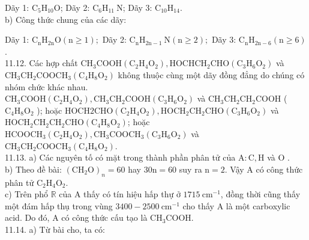 \documentclass[10pt]{article}
\begin{document}
Dãy 1: $\mathrm{C}_{5} \mathrm{H}_{10} \mathrm{O}$; Dãy 2: $\mathrm{C}_{6} \mathrm{H}_{11} \mathrm{~N}$; Dãy 3: $\mathrm{C}_{10} \mathrm{H}_{14}$.\\
b) Công thức chung của các dãy:

Dãy 1: $\mathrm{C}_{\mathrm{n}} \mathrm{H}_{2 \mathrm{n}} \mathrm{O}(\mathrm{n} \geq 1) ;$ Dãy 2: $\mathrm{C}_{\mathrm{n}} \mathrm{H}_{2 \mathrm{n}-1} \mathrm{~N}(\mathrm{n} \geq 2) ;$ Dãy 3: $\mathrm{C}_{\mathrm{n}} \mathrm{H}_{2 \mathrm{n}-6}(\mathrm{n} \geq 6)$.\\
11.12. Các hợp chất $\mathrm{CH}_{3} \mathrm{COOH}\left(\mathrm{C}_{2} \mathrm{H}_{4} \mathrm{O}_{2}\right), \mathrm{HOCH} \mathrm{CH}_{2} \mathrm{CHO}\left(\mathrm{C}_{3} \mathrm{H}_{6} \mathrm{O}_{2}\right)$ và $\mathrm{CH}_{3} \mathrm{CH}_{2} \mathrm{COOCH}_{3}\left(\mathrm{C}_{4} \mathrm{H}_{8} \mathrm{O}_{2}\right)$ không thuộc cùng một dãy đồng đẳng do chúng có nhóm chức khác nhau.\\
$\mathrm{CH}_{3} \mathrm{COOH}\left(\mathrm{C}_{2} \mathrm{H}_{4} \mathrm{O}_{2}\right), \mathrm{CH}_{3} \mathrm{CH}_{2} \mathrm{COOH}\left(\mathrm{C}_{3} \mathrm{H}_{6} \mathrm{O}_{2}\right)$ và $\mathrm{CH}_{3} \mathrm{CH}_{2} \mathrm{CH}_{2} \mathrm{COOH}$ ( $\mathrm{C}_{4} \mathrm{H}_{8} \mathrm{O}_{2}$ ); hoặc $\mathrm{HOCH} 2 \mathrm{CHO}\left(\mathrm{C}_{2} \mathrm{H}_{4} \mathrm{O}_{2}\right), \mathrm{HOCH}_{2} \mathrm{CH}_{2} \mathrm{CHO}\left(\mathrm{C}_{3} \mathrm{H}_{6} \mathrm{O}_{2}\right)$ và $\mathrm{HOCH}_{2} \mathrm{CH}_{2} \mathrm{CH}_{2} \mathrm{CHO}\left(\mathrm{C}_{4} \mathrm{H}_{8} \mathrm{O}_{2}\right)$; hoặc $\mathrm{HCOOCH}_{3}\left(\mathrm{C}_{2} \mathrm{H}_{4} \mathrm{O}_{2}\right), \mathrm{CH}_{3} \mathrm{COOCH}_{3} \left(\mathrm{C}_{3} \mathrm{H}_{6} \mathrm{O}_{2}\right)$ và $\mathrm{CH}_{3} \mathrm{CH}_{2} \mathrm{COOCH}_{3}\left(\mathrm{C}_{4} \mathrm{H}_{8} \mathrm{O}_{2}\right)$.\\
11.13. a) Các nguyên tố có mặt trong thành phần phân tử của $\mathrm{A}: \mathrm{C}, \mathrm{H}$ và O .\\
b) Theo đề bài: $\left(\mathrm{CH}_{2} \mathrm{O}\right)_{n}=60$ hay $30 \mathrm{n}=60$ suy ra $\mathrm{n}=2$. Vậy A có công thức phân tử $\mathrm{C}_{2} \mathrm{H}_{4} \mathrm{O}_{2}$.\\
c) Trên phổ $\mathbb{R}$ của A thấy có tín hiệu hấp thự ở $1715 \mathrm{~cm}^{-1}$, đồng thời cũng thấy một đám hấp thụ trong vùng $3400-2500 \mathrm{~cm}^{-1}$ cho thấy A là một carboxylic acid. Do đó, A có công thức cấu tạo là $\mathrm{CH}_{3} \mathrm{COOH}$.\\
11.14. a) Từ bài cho, ta có:
\end{document}
